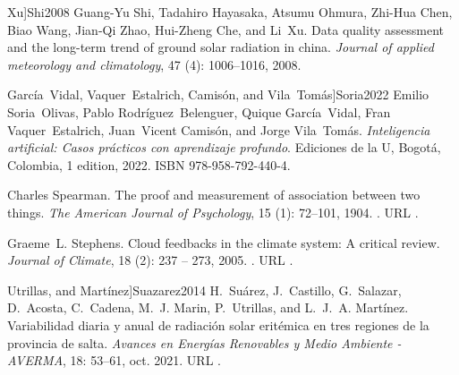 \documentclass[letterpaper,12pt, twoside]{report}
\providecommand{\DIFdeltex}[1]{{\protect\color{red} \scriptsize #1}} %
\providecommand{\DIFdel}[1]{\texorpdfstring{\DIFdeltex{#1}}{}} %
\begin{document}
  Xu]{Shi2008}
\DIFdel{Guang-Yu Shi, Tadahiro Hayasaka, Atsumu Ohmura, Zhi-Hua Chen, Biao Wang,
  Jian-Qi Zhao, Hui-Zheng Che, and Li~Xu.
}%
\DIFdel{Data quality assessment and the long-term trend of ground solar
  radiation in china.
}%
\DIFdel{\emph{Journal of applied meteorology and climatology}, 47}%
\DIFdel{(4):}%
\DIFdel{1006--1016, 2008.
}%

  García~Vidal, Vaquer~Estalrich, Camisón, and Vila~Tomás]{Soria2022}
\DIFdel{Emilio Soria~Olivas, Pablo Rodríguez~Belenguer, Quique García~Vidal, Fran
  Vaquer~Estalrich, Juan~Vicent Camisón, and Jorge Vila~Tomás.
}%
\DIFdel{\emph{Inteligencia artificial: Casos prácticos con aprendizaje
  profundo}.
}%
\DIFdel{Ediciones de la U, Bogotá, Colombia, 1 edition, 2022.
}%
\DIFdel{ISBN 978-958-792-440-4.
}%

\DIFdel{Charles Spearman.
}%
\DIFdel{The proof and measurement of association between two things.
}%
\DIFdel{\emph{The American Journal of Psychology}, 15}%
\DIFdel{(1):}%
\DIFdel{72--101, 1904.
}%
\DIFdel{.
}%
\DIFdel{URL }%
\DIFdel{.
}%

\DIFdel{Graeme~L. Stephens.
}%
\DIFdel{Cloud feedbacks in the climate system: A critical review.
}%
\DIFdel{\emph{Journal of Climate}, 18}%
\DIFdel{(2):}%
\DIFdel{237 -- 273,
  2005.
}%
\DIFdel{.
}%
\DIFdel{URL
  }%
\DIFdel{.
}%

  Utrillas, and Martínez]{Suazarez2014}
\DIFdel{H.~Suárez, J.~Castillo, G.~Salazar, D.~Acosta, C.~Cadena, M.~J. Marin,
  P.~Utrillas, and L.~J.~A. Martínez.
}%
\DIFdel{Variabilidad diaria y anual de radiación solar eritémica en tres
  regiones de la provincia de salta.
}%
\DIFdel{\emph{Avances en Energías Renovables y Medio Ambiente - AVERMA},
  18:}%
\DIFdel{53–61, oct. 2021.
}%
\DIFdel{URL
  }%
\DIFdel{.
}%
\end{document}
